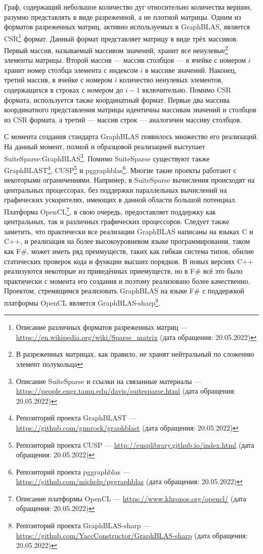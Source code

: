 \documentclass[14pt]{matmex-diploma-custom}
\begin{document}
Граф, содержащий небольшое количество дуг относительно количества вершин, разумно представлять в виде разреженной, а не плотной матрицы. Одним из форматов разреженных матриц, активно используемых в GraphBLAS, является CSR\footnote{Описание различных форматов разреженных матриц --- \url{https://en.wikipedia.org/wiki/Sparse\_matrix} (дата обращения: 20.05.2022)} формат. Данный формат представляет матрицу в виде трёх массивов. Первый массив, называемый массивом значений, хранит все ненулевые\footnote{В разреженных матрицах, как правило, не хранят нейтральный по сложению элемент полукольца} элементы матрицы. Второй массив --- массив столбцов --- в ячейке с номером $i$ хранит номер столбца элемента с индексом $i$ в массиве значений. Наконец, третий 
массив, в ячейке с номером $i$ количество ненулевых элементов, содержащихся в строках с номером до $i-1$ включительно. Помимо CSR формата, используется также координатный формат. Первые два массива координатного представления матрицы идентичны массивам значений и столбцов из CSR формата, а третий --- массив строк --- аналогичен массиву столбцов.

С момента создания стандарта GraphBLAS появилось множество его реализаций. На данный момент, полной и образцовой реализацией выступает SuiteSparse:GraphBLAS\footnote{Описание SuiteSparse и ссылки на связанные материалы --- \url{https://people.engr.tamu.edu/davis/suitesparse.html} (дата обращения: 20.05.2022)}\cite{SS}. Помимо SuiteSparse существуют также GraphBLAST\footnote{Репозиторий проекта GraphBLAST --- \url{https://github.com/gunrock/graphblast} (дата обращения: 20.05.2022)}\cite{GBT}, CUSP\footnote{Репозиторий проекта CUSP --- \url{http://cusplibrary.github.io/index.html} (дата обращения: 20.05.2022)} и pggraphblas\footnote{Репозиторий проекта pggraphblas --- \url{https://github.com/michelp/pggraphblas} (дата обращения: 20.05.2022)}. Многие такие проекты работают с некоторыми ограничениями. Например, в SuiteSparse вычисления происходят на центральных процессорах, без поддержки параллельных вычислений на графических ускорителях, имеющих в данной области большой потенциал. Платформа OpenCL\footnote{Описание платформы OpenCL --- \url{https://www.khronos.org/opencl/} (дата обращения: 20.05.2022)}, в свою очередь, предоставляет поддержку как центральных, так и различных графических процессоров. Следует также заметить, что практически все реализации GraphBLAS написаны на языках C и C++, и реализация на более высокоуровневом языке программирования, таком как F\#, может иметь ряд преимуществ, таких как гибкая система типов, обилие статических проверок кода и функции высших порядков. В новых версиях C++ реализуются некоторые из приведённых приемуществ, но в F\# всё это было практически с момента его создания и поэтому реализовано более качественно. Проектом, стремящимся реализовать GraphBLAS на языке F\# с поддержкой платформы OpenCL является GraphBLAS-sharp\footnote{Репозиторий проекта GraphBLAS-sharp --- \url{https://github.com/YaccConstructor/GraphBLAS-sharp} (дата обращения: 20.05.2022)}.
\end{document}
